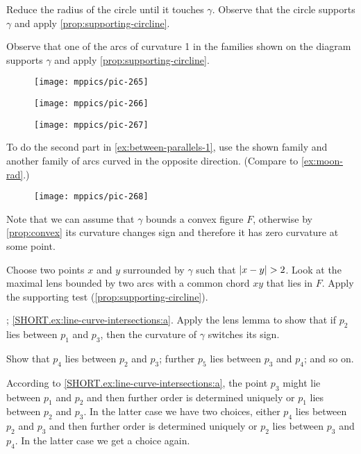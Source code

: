  Reduce the radius of the circle until it touches $\gamma$.
Observe that the circle supports $\gamma$ and apply \ref{prop:supporting-circline}.


Observe that one of the arcs of curvature 1 in the families shown on the diagram supports $\gamma$ and apply \ref{prop:supporting-circline}.
\begin{figure}[h!]
\begin{minipage}{.50\textwidth}
\centering
\texttt{[image: mppics/pic-265]}
\end{minipage}\hfill
\begin{minipage}{.26\textwidth}
\centering
\texttt{[image: mppics/pic-266]}
\end{minipage}
\hfill
\begin{minipage}{.20\textwidth}
\centering
\texttt{[image: mppics/pic-267]}
\end{minipage}
\end{figure}
To do the second part in \ref{ex:between-parallels-1}, use the shown family and another family of arcs curved in the opposite direction.
(Compare to \ref{ex:moon-rad}.) 

\begin{wrapfigure}[4]{r}{34 mm}
\vskip-0mm
\centering
\texttt{[image: mppics/pic-268]}
\vskip0mm
\end{wrapfigure}

Note that we can assume that $\gamma$ bounds a convex figure $F$, otherwise by \ref{prop:convex} its curvature changes sign and therefore it has zero curvature at some point.

Choose two points $x$ and $y$ surrounded by $\gamma$ such that $|x\z-y|\z>2$.
Look at the maximal lens bounded by two arcs with a common chord $xy$ that lies in $F$.
Apply the supporting test (\ref{prop:supporting-circline}).

\parbf{\ref{ex:line-curve-intersections}}; \ref{SHORT.ex:line-curve-intersections:a}.
Apply the lens lemma to show that if $p_2$ lies between $p_1$ and $p_3$, then the curvature of $\gamma$ switches its sign.

 Show that $p_4$ lies between $p_2$ and $p_3$;
further $p_5$ lies between $p_3$ and $p_4$;
and so on.

According to \ref{SHORT.ex:line-curve-intersections:a}, the point $p_3$ might lie between $p_1$ and $p_2$ and then further order is determined uniquely or $p_1$ lies between $p_2$ and $p_3$.
In the latter case we have two choices, either $p_4$ lies between $p_2$ and $p_3$ and then further order is determined uniquely or $p_2$ lies between $p_3$ and $p_4$.
In the latter case we get a choice again.


